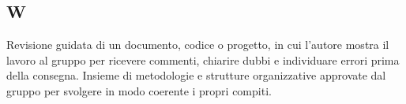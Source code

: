 \begin{center}
\section*{W}
\end{center}
Revisione guidata di un documento, codice o progetto, in cui l'autore mostra il lavoro al gruppo per ricevere commenti, chiarire dubbi e individuare errori prima della consegna.
Insieme di metodologie e strutture organizzative approvate dal gruppo per svolgere in modo coerente i propri compiti.
